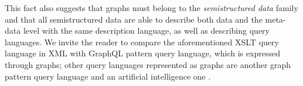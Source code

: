 This fact also suggests that graphs must belong to the \textit{semistructured data} family and that all semistructured data are able to describe both data and the meta-data level with the same description language, as well as describing query languages. We invite the reader to compare the aforementioned XSLT query language in XML with GraphQL \cite{GraphLogAggr} pattern query language, which is expressed through graphs; other query languages represented as graphs are another graph pattern query language \cite{n3} and an artificial intelligence one \cite{Goertzel2014}.
